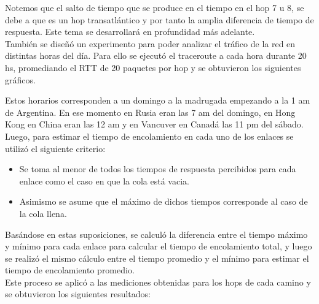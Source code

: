 Notemos que el salto de tiempo que se produce en el tiempo en el hop 7 u 8, se debe a que es un hop transatl\'antico y por tanto la amplia diferencia de tiempo de respuesta. Este tema se desarrollará en profundidad más adelante. \\

Tambi\'en se dise\~nó un experimento para poder analizar el tr\'afico de la red en distintas horas del d\'ia. Para ello se ejecutó el traceroute a cada hora durante 20 hs, promediando el RTT de 20 paquetes por hop y se obtuvieron los siguientes gr\'aficos.




Estos horarios corresponden a un domingo a la madrugada empezando a la 1 am de Argentina. En ese momento en Rusia eran las 7 am del domingo, en Hong Kong en China eran las 12 am y en Vancuver en Canad\'a las 11 pm del s\'abado. \\

Luego, para estimar el tiempo de encolamiento en cada uno de los enlaces se utilizó el siguiente criterio:
\begin{itemize}
\item Se toma al menor de todos los tiempos de respuesta percibidos para cada enlace como el caso en que la cola está vacia.
\item Asimismo se asume que el máximo de dichos tiempos corresponde al caso de la cola llena.
\end{itemize}
Basándose en estas suposiciones, se calculó la diferencia entre el tiempo máximo y mínimo para cada enlace para calcular el tiempo de encolamiento total, y luego se realizó el mismo
cálculo entre el tiempo promedio y el mínimo para estimar el tiempo de encolamiento promedio. \\

Este proceso se aplicó a las mediciones obtenidas para los hops de cada camino y se obtuvieron los siguientes resultados:


